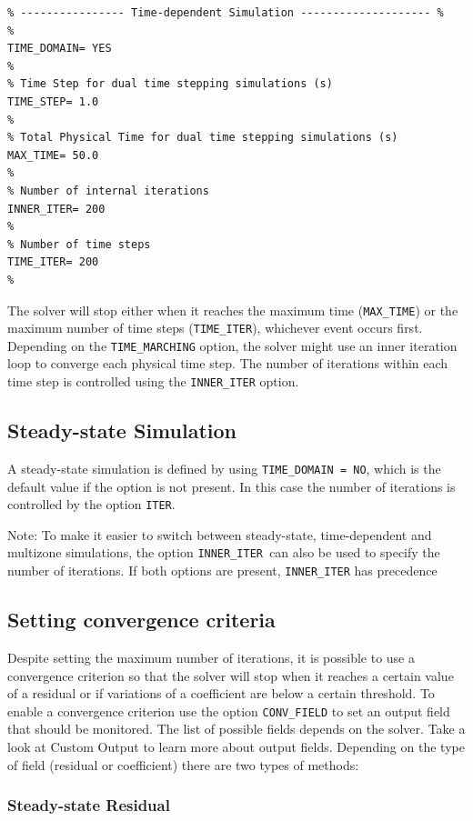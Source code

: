 \documentclass[12pt, a4paper, twoside]{article}
\begin{document}
\begin{lstlisting}
% ---------------- Time-dependent Simulation -------------------- %
%
TIME_DOMAIN= YES
%
% Time Step for dual time stepping simulations (s)
TIME_STEP= 1.0
%
% Total Physical Time for dual time stepping simulations (s)
MAX_TIME= 50.0
%
% Number of internal iterations 
INNER_ITER= 200
%
% Number of time steps
TIME_ITER= 200
%
\end{lstlisting}


The solver will stop either when it reaches the maximum time (\verb|MAX_TIME|) or the maximum number of time steps (\verb|TIME_ITER|), whichever event occurs first. Depending on the \verb|TIME_MARCHING| option, the solver might use an inner iteration loop to converge each physical time step. The number of iterations within each time step is controlled using the \verb|INNER_ITER| option.


\subsection{Steady-state Simulation}
A steady-state simulation is defined by using \verb|TIME_DOMAIN = NO|, which is the default value if the option is not present. In this case the number of iterations is controlled by the option \verb|ITER|.

Note: To make it easier to switch between steady-state, time-dependent and multizone simulations, the option \verb|INNER_ITER |can also be used to specify the number of iterations. If both options are present, \verb|INNER_ITER| has precedence

\subsection{Setting convergence criteria}
Despite setting the maximum number of iterations, it is possible to use a convergence criterion so that the solver will stop when it reaches a certain value of a residual or if variations of a coefficient are below a certain threshold. To enable a convergence criterion use the option \verb|CONV_FIELD| to set an output field that should be monitored. The list of possible fields depends on the solver. Take a look at Custom Output to learn more about output fields. Depending on the type of field (residual or coefficient) there are two types of methods:

\subsubsection{Steady-state Residual}
\end{document}
